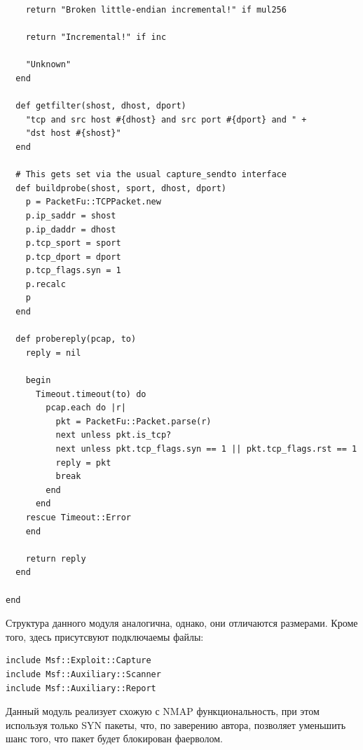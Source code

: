 \documentclass[10pt,a4paper]{article}
\begin{document}
\begin{lstlisting}
    return "Broken little-endian incremental!" if mul256

    return "Incremental!" if inc

    "Unknown"
  end

  def getfilter(shost, dhost, dport)
    "tcp and src host #{dhost} and src port #{dport} and " +
    "dst host #{shost}"
  end

  # This gets set via the usual capture_sendto interface
  def buildprobe(shost, sport, dhost, dport)
    p = PacketFu::TCPPacket.new
    p.ip_saddr = shost
    p.ip_daddr = dhost
    p.tcp_sport = sport
    p.tcp_dport = dport
    p.tcp_flags.syn = 1
    p.recalc
    p
  end

  def probereply(pcap, to)
    reply = nil

    begin
      Timeout.timeout(to) do
        pcap.each do |r|
          pkt = PacketFu::Packet.parse(r)
          next unless pkt.is_tcp?
          next unless pkt.tcp_flags.syn == 1 || pkt.tcp_flags.rst == 1
          reply = pkt
          break
        end
      end
    rescue Timeout::Error
    end

    return reply
  end

end

\end{lstlisting}

Структура данного модуля аналогична, однако, они отличаются размерами. Кроме того, здесь присутсвуют подключаемы файлы:

\begin{verbatim}
include Msf::Exploit::Capture
include Msf::Auxiliary::Scanner
include Msf::Auxiliary::Report
\end{verbatim}

Данный модуль реализует схожую с NMAP функциональность, при этом используя только SYN пакеты, что, по заверению автора, позволяет уменьшить шанс того, что пакет будет блокирован фаерволом.
\end{document}
